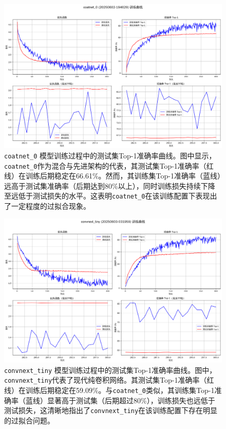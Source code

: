 \documentclass[a4paper]{article}
\begin{document}
\begin{figure}[H]
    \centering
    \includegraphics[width=\textwidth]{fig/training_curves_coatnet_0.png}
    \caption{\texttt{coatnet\_0} 模型训练过程中的测试集Top-1准确率曲线。图中显示，\texttt{coatnet\_0}作为混合与先进架构的代表，其测试集Top-1准确率（红线）在训练后期稳定在66.61\%。然而，其训练集Top-1准确率（蓝线）远高于测试集准确率（后期达到80\%以上），同时训练损失持续下降至远低于测试损失的水平。这表明\texttt{coatnet\_0}在该训练配置下表现出了一定程度的过拟合现象。}
    \label{fig:train_curve_coatnet0}
\end{figure}

\begin{figure}[H]
    \centering
    \includegraphics[width=\textwidth]{fig/training_curves_convnext_tiny.png}
    \caption{\texttt{convnext\_tiny} 模型训练过程中的测试集Top-1准确率曲线。图中，\texttt{convnext\_tiny}代表了现代纯卷积网络。其测试集Top-1准确率（红线）在训练后期稳定在59.09\%。与\texttt{coatnet\_0}类似，其训练集Top-1准确率（蓝线）显著高于测试集（后期超过80\%），训练损失也远低于测试损失，这清晰地指出了\texttt{convnext\_tiny}在该训练配置下存在明显的过拟合问题。}
    \label{fig:train_curve_convnexttiny}
\end{figure}
\end{document}
